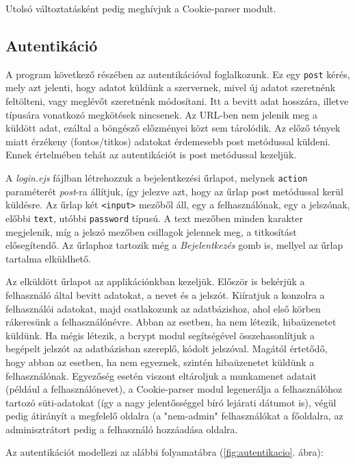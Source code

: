 Utolsó változtatásként pedig meghívjuk a Cookie-parser modult.


\subsection{Autentikáció}

A program következő részében az autentikációval foglalkozunk. Ez egy \texttt{post} kérés, mely azt jelenti, hogy adatot küldünk a szervernek, mivel új adatot szeretnénk feltölteni, vagy meglévőt szeretnénk módosítani. Itt a bevitt adat hosszára, illetve típusára vonatkozó megkötések nincsenek. Az URL-ben nem jelenik meg a küldött adat, ezáltal a böngésző előzményei közt sem tárolódik. Az előző tények miatt érzékeny (fontos/titkos) adatokat érdemesebb post metódussal küldeni. Ennek értelmében tehát az autentikációt is post metódussal kezeljük.

A \textit{login.ejs} fájlban létrehozzuk a bejelentkezési űrlapot, melynek \texttt{action} paraméterét \textit{post}-ra állítjuk, így jelezve azt, hogy az űrlap post metódussal kerül küldésre. Az űrlap két \texttt{<input>} mezőből áll, egy a felhasználónak, egy a jelszónak,  előbbi \texttt{text}, utóbbi \texttt{password} típusú. A text mezőben minden karakter megjelenik, míg a jelszó mezőben csillagok jelennek meg, a titkosítást elősegítendő. Az űrlaphoz tartozik még a \textit{Bejelentkezés} gomb is, mellyel az űrlap tartalma elküldhető.

Az elküldött űrlapot az applikációnkban kezeljük. Először is bekérjük a felhasználó által bevitt adatokat, a nevet és a jelszót. Kiíratjuk a konzolra a felhasználói adatokat, majd csatlakozunk az adatbázishoz, ahol első körben rákeresünk a felhasználónévre. Abban az esetben, ha nem létezik, hibaüzenetet küldünk. Ha mégis létezik, a bcrypt modul segítségével összehasonlítjuk a begépelt jelszót az adatbázisban szereplő, kódolt jelszóval. Magától értetődő, hogy abban az esetben, ha nem egyeznek, szintén hibaüzenetet küldünk a felhasználónak. Egyezőség esetén viszont eltároljuk a munkamenet adatait (például a felhasználónevet), a Cookie-parser modul legenerálja a felhasználóhoz tartozó süti-adatokat (így a nagy jelentősséggel bíró lejárati dátumot is), végül pedig átirányít a megfelelő oldalra (a "nem-admin" felhasználókat a főoldalra, az adminisztrátort pedig a felhasználó hozzáadása oldalra.

Az autentikációt modellezi az alábbi folyamatábra (\ref{fig:autentikacio}. ábra):

